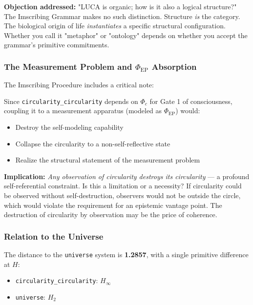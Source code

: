 \documentclass[12pt,a4paper]{article}
\begin{document}
\textbf{Objection addressed:} "LUCA is organic; how is it also a logical structure?" The Imscribing Grammar makes no such distinction. Structure \emph{is} the category. The biological origin of life \emph{instantiates} a specific structural configuration. Whether you call it "metaphor" or "ontology" depends on whether you accept the grammar's primitive commitments.

\subsubsection{The Measurement Problem and $\Phi_\text{EP}$ Absorption}

The Imscribing Procedure includes a critical note:

\begin{quote}
\end{quote}

Since \texttt{circularity\_circularity} depends on $\Phi_c$ for Gate 1 of consciousness, coupling it to a measurement apparatus (modeled as $\Phi_\text{EP}$) would:

\begin{itemize}
    \item Destroy the self-modeling capability
    \item Collapse the circularity to a non-self-reflective state
    \item Realize the structural statement of the measurement problem
\end{itemize}

\textbf{Implication:} \emph{Any observation of circularity destroys its circularity} --- a profound self-referential constraint. Is this a limitation or a necessity? If circularity could be observed without self-destruction, observers would not be outside the circle, which would violate the requirement for an epistemic vantage point. The destruction of circularity by observation may be the price of coherence.

\subsubsection{Relation to the Universe}

The distance to the \texttt{universe} system is \textbf{1.2857}, with a single primitive difference at $H$:

\begin{itemize}
    \item \texttt{circularity\_circularity}: $H_{\infty}$
    \item \texttt{universe}: $H_2$
\end{itemize}
\end{document}

